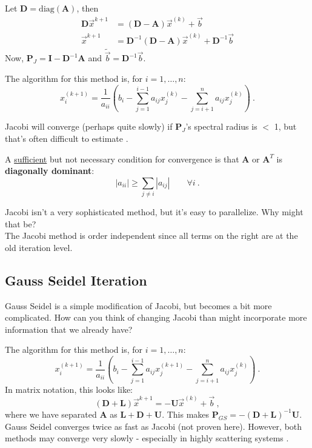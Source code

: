 \documentclass[12pt]{article}
\newcommand{\ve}[1]{\ensuremath{\mathbf{#1}}}
\begin{document}
Let $\ve{D} = \text{diag}(\ve{A})$, then
\begin{align}
\ve{D} \vec{x}^{k+1} &= (\ve{D} - \ve{A})\vec{x}^{(k)} + \vec{b} \nonumber \\
%
\vec{x}^{k+1} &= \ve{D}^{-1}(\ve{D} - \ve{A})\vec{x}^{(k)} + \ve{D}^{-1}\vec{b} \nonumber
\end{align}
%
Now, $\ve{P}_J = \ve{I} -  \ve{D}^{-1}\ve{A}$ and $\tilde{\vec{b}} =\ve{D}^{-1}\vec{b}$.

The algorithm for this method is, for $i = 1, \dots, n$:
\[ x^{(k+1)}_i = \frac{1}{a_{ii}}(b_i - \sum_{j=1}^{i-1} a_{ij} x_j^{(k)} - \sum_{j=i+1}^{n} a_{ij} x_j^{(k)})\:.\]

Jacobi will converge (perhaps quite slowly) if $\ve{P}_J$'s spectral radius is $<$ 1, but that's often difficult to estimate \cite{LeVeque2007}. 

A \underline{sufficient} but not necessary condition for convergence is that $\ve{A}$ or $\ve{A}^T$ is \textbf{diagonally dominant}:
%
\[|a_{ii}| \geq \sum_{j \neq i} |a_{ij}| \qquad \forall i \:.\]

Jacobi isn't a very sophisticated method, but it's easy to parallelize. Why might that be? \\The Jacobi method is order independent since all terms on the right are at the old iteration level. 


\subsection*{Gauss Seidel Iteration}

Gauss Seidel is a simple modification of Jacobi, but becomes a bit more complicated. How can you think of changing Jacobi than might incorporate more information that we already have?

The algorithm for this method is, for $i = 1, \dots, n$:
\[ x^{(k+1)}_i = \frac{1}{a_{ii}}(b_i - \sum_{j=1}^{i-1} a_{ij} x_j^{(k+1)} - \sum_{j=i+1}^{n} a_{ij} x_j^{(k)}) \:.\]
%
In matrix notation, this looks like:
\[(\ve{D} + \ve{L})\vec{x}^{k+1} = -\ve{U} \vec{x}^{(k)} + \vec{b}\:, \]
where we have separated $\ve{A}$ as $\ve{L} + \ve{D} + \ve{U}$. This makes $\ve{P}_{GS} = -(\ve{D} + \ve{L})^{-1}\ve{U}$. Gauss Seidel %
converges twice as fast as Jacobi (not proven here). However, both methods may converge very slowly - especially in highly scattering systems \cite{LeVeque2007}. 
\end{document}

